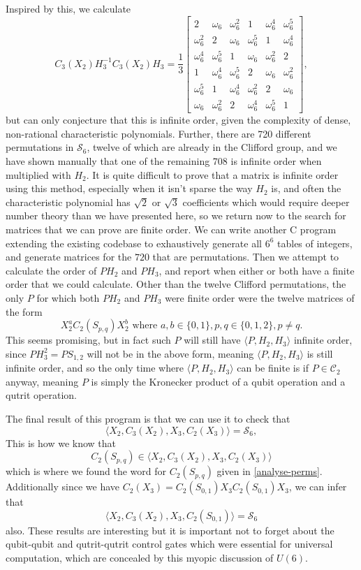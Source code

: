 Inspired by this, we calculate
\[C_3(X_2) H_3^{-1} C_3(X_2) H_3 =
\frac{1}{3} \begin{bmatrix}
	2 & \omega_6 & \omega_6^2 & 1 & \omega_6^4 & \omega_6^5 \\
	\omega_6^2 & 2 & \omega_6 & \omega_6^5 & 1 & \omega_6^4 \\
	\omega_6^4 & \omega_6^5 & 1 & \omega_6 & \omega_6^2 & 2 \\
	1 & \omega_6^4 & \omega_6^5 & 2 & \omega_6 & \omega_6^2 \\
	\omega_6^5 & 1 & \omega_6^4 & \omega_6^2 & 2 & \omega_6 \\
	\omega_6 & \omega_6^2 & 2 & \omega_6^4 & \omega_6^5 & 1
\end{bmatrix},
\]
but can only conjecture that this is infinite order, given the complexity of dense, non-rational characteristic polynomials. Further, there are 720 different permutations in $\mathcal{S}_6$, twelve of which are already in the Clifford group, and we have shown manually that one of the remaining 708 is infinite order when multiplied with $H_2$. It is quite difficult to prove that a matrix is infinite order using this method, especially when it isn't sparse the way $H_2$ is, and often the characteristic polynomial has $\sqrt{2}$ or $\sqrt{3}$ coefficients which would require deeper number theory than we have presented here, so we return now to the search for matrices that we can prove are finite order. We can write another C program extending the existing codebase to exhaustively generate all $6^6$ tables of integers, and generate matrices for the $720$ that are permutations. Then we attempt to calculate the order of $P H_2$ and $P H_3$, and report when either or both have a finite order that we could calculate. Other than the twelve Clifford permutations, the only $P$ for which both $P H_2$ and $P H_3$ were finite order were the twelve matrices of the form
\[X_2^a C_2(S_{p,q}) X_2^b\text{\ where\ }a, b \in \{0, 1\}, p, q \in \{0, 1, 2\}, p \neq q.\]
This seems promising, but in fact such $P$ will still have $\langle P, H_2, H_3\rangle$ infinite order, since $P H_3^2 = P S_{1,2}$ will not be in the above form, meaning $\langle P, H_2, H_3 \rangle$ is still infinite order, and so the only time where $\langle P, H_2, H_3 \rangle$ can be finite is if $P \in \mathcal{C}_2$ anyway, meaning $P$ is simply the Kronecker product of a qubit operation and a qutrit operation.

The final result of this program is that we can use it to check that
\[\langle X_2, C_3(X_2), X_3, C_2(X_3) \rangle = \mathcal{S}_6,\]
This is how we know that
\[C_2(S_{p,q}) \in \langle X_2, C_3(X_2), X_3, C_2(X_3) \rangle\]
which is where we found the word for $C_2(S_{p,q})$ given in \autoref{analyse-perms}. Additionally since we have $C_2(X_3) = C_2(S_{0,1})X_3C_2(S_{0,1})X_3$, we can infer that
\[\langle X_2, C_3(X_2), X_3, C_2(S_{0,1})\rangle = \mathcal{S}_6\]
also. These results are interesting but it is important not to forget about the qubit-qubit and qutrit-qutrit control gates which were essential for universal computation, which are concealed by this myopic discussion of $U(6)$.

